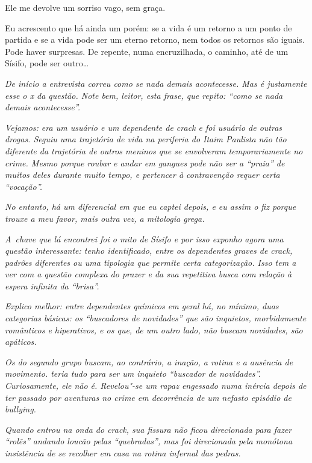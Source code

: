 Ele me devolve um sorriso vago, sem graça.

Eu acrescento que há ainda um porém: se a vida é um retorno a um ponto
de partida e se a vida pode ser um eterno retorno, nem todos os retornos
são iguais. Pode haver surpresas. De repente, numa encruzilhada, o
caminho, até de um Sísifo, pode ser outro…

\begin{center}\asterisc{}\end{center}
\begingroup\small

\emph{De início a entrevista correu como se nada demais acontecesse. Mas
é justamente esse o x da questão. Note bem, leitor, esta frase, que
repito: ``como se nada demais acontecesse''.}~

\emph{Vejamos:  era um usuário e um dependente de crack e foi usuário
de outras drogas. Seguiu uma trajetória de vida na periferia do Itaim
Paulista não tão diferente da trajetória de outros meninos que se
envolveram temporariamente no crime. Mesmo porque roubar e andar em
gangues pode não ser a ``praia'' de muitos deles durante muito tempo, e
pertencer à contravenção requer certa ``vocação''.}~

\emph{No entanto, há um diferencial em  que eu captei depois, e eu
assim o fiz porque trouxe a meu favor, mais outra vez, a mitologia
grega.}~

\emph{A~chave que lá encontrei foi o mito de Sísifo e por isso exponho
agora uma questão interessante: tenho identificado, entre os dependentes
graves de crack, padrões diferentes ou uma tipologia que permite certa
categorização. Isso tem a ver com a questão complexa do prazer e da sua
repetitiva busca com relação à espera infinita da ``brisa''.}~

\emph{Explico melhor: entre dependentes químicos em geral há, no mínimo,
duas categorias básicas: os ``buscadores de novidades'' que são
inquietos, morbidamente românticos e hiperativos, e os que, de um outro
lado, não buscam novidades, são apáticos.}~

\emph{Os do segundo grupo buscam, ao contrário, a inação, a rotina e a
ausência de movimento.  teria tudo para ser um inquieto ``buscador de
novidades''. Curiosamente, ele não é. Revelou"-se um rapaz engessado numa
inércia depois de ter passado por aventuras no crime em decorrência de
um nefasto episódio de bullying.}~

\emph{Quando  entrou na onda do crack, sua fissura não ficou
direcionada para fazer ``rolês'' andando loucão pelas ``quebradas'', mas
foi direcionada pela monótona insistência de se recolher em casa na
rotina infernal das pedras.}~

